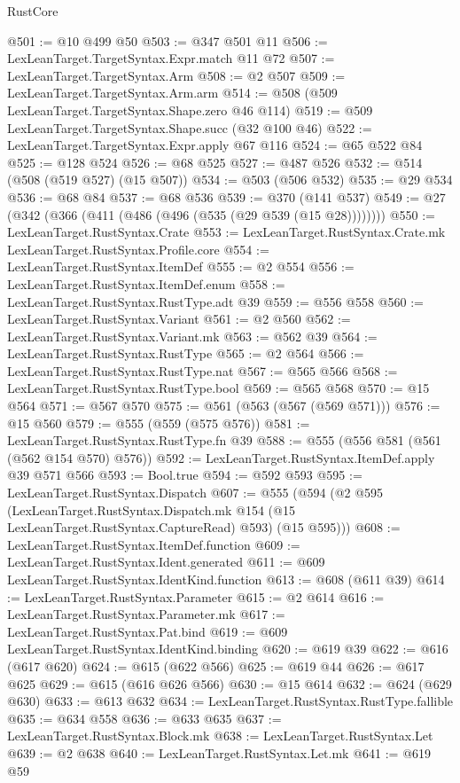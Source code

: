 \begin{lexlean}{RustCore}
\begin{coremodule}
@501 := @10 @499 @50
@503 := @347 @501 @11
@506 := LexLeanTarget.TargetSyntax.Expr.match @11 @72
@507 := LexLeanTarget.TargetSyntax.Arm
@508 := @2 @507
@509 := LexLeanTarget.TargetSyntax.Arm.arm
@514 := @508 (@509 LexLeanTarget.TargetSyntax.Shape.zero @46 @114)
@519 := @509 LexLeanTarget.TargetSyntax.Shape.succ (@32 @100 @46)
@522 := LexLeanTarget.TargetSyntax.Expr.apply @67 @116
@524 := @65 @522 @84
@525 := @128 @524
@526 := @68 @525
@527 := @487 @526
@532 := @514 (@508 (@519 @527) (@15 @507))
@534 := @503 (@506 @532)
@535 := @29 @534
@536 := @68 @84
@537 := @68 @536
@539 := @370 (@141 @537)
@549 := @27 (@342 (@366 (@411 (@486 (@496 (@535 (@29 @539 (@15 @28))))))))
@550 := LexLeanTarget.RustSyntax.Crate
@553 := LexLeanTarget.RustSyntax.Crate.mk LexLeanTarget.RustSyntax.Profile.core
@554 := LexLeanTarget.RustSyntax.ItemDef
@555 := @2 @554
@556 := LexLeanTarget.RustSyntax.ItemDef.enum
@558 := LexLeanTarget.RustSyntax.RustType.adt @39
@559 := @556 @558
@560 := LexLeanTarget.RustSyntax.Variant
@561 := @2 @560
@562 := LexLeanTarget.RustSyntax.Variant.mk
@563 := @562 @39
@564 := LexLeanTarget.RustSyntax.RustType
@565 := @2 @564
@566 := LexLeanTarget.RustSyntax.RustType.nat
@567 := @565 @566
@568 := LexLeanTarget.RustSyntax.RustType.bool
@569 := @565 @568
@570 := @15 @564
@571 := @567 @570
@575 := @561 (@563 (@567 (@569 @571)))
@576 := @15 @560
@579 := @555 (@559 (@575 @576))
@581 := LexLeanTarget.RustSyntax.RustType.fn @39
@588 := @555 (@556 @581 (@561 (@562 @154 @570) @576))
@592 := LexLeanTarget.RustSyntax.ItemDef.apply @39 @571 @566
@593 := Bool.true
@594 := @592 @593
@595 := LexLeanTarget.RustSyntax.Dispatch
@607 := @555
    (@594
      (@2
        @595
        (LexLeanTarget.RustSyntax.Dispatch.mk @154 (@15 LexLeanTarget.RustSyntax.CaptureRead) @593)
        (@15 @595)))
@608 := LexLeanTarget.RustSyntax.ItemDef.function
@609 := LexLeanTarget.RustSyntax.Ident.generated
@611 := @609 LexLeanTarget.RustSyntax.IdentKind.function
@613 := @608 (@611 @39)
@614 := LexLeanTarget.RustSyntax.Parameter
@615 := @2 @614
@616 := LexLeanTarget.RustSyntax.Parameter.mk
@617 := LexLeanTarget.RustSyntax.Pat.bind
@619 := @609 LexLeanTarget.RustSyntax.IdentKind.binding
@620 := @619 @39
@622 := @616 (@617 @620)
@624 := @615 (@622 @566)
@625 := @619 @44
@626 := @617 @625
@629 := @615 (@616 @626 @566)
@630 := @15 @614
@632 := @624 (@629 @630)
@633 := @613 @632
@634 := LexLeanTarget.RustSyntax.RustType.fallible
@635 := @634 @558
@636 := @633 @635
@637 := LexLeanTarget.RustSyntax.Block.mk
@638 := LexLeanTarget.RustSyntax.Let
@639 := @2 @638
@640 := LexLeanTarget.RustSyntax.Let.mk
@641 := @619 @59

\end{coremodule}
\end{lexlean}
